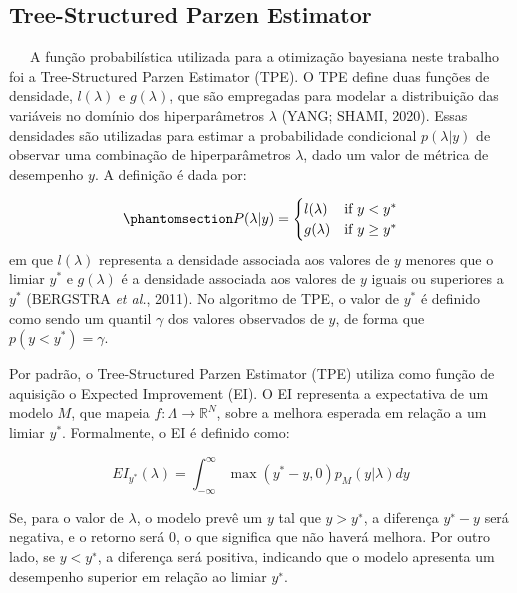 \documentclass[
  12pt,
  a4paper,
]{scrreprt}
\begin{document}
\subsection{Tree-Structured Parzen
Estimator}\label{tree-structured-parzen-estimator}

~~~A função probabilística utilizada para a otimização bayesiana neste
trabalho foi a Tree-Structured Parzen Estimator (TPE). O TPE define duas
funções de densidade, \(l\left(\lambda\right)\) e
\(g\left(\lambda\right)\), que são empregadas para modelar a
distribuição das variáveis no domínio dos hiperparâmetros \(\lambda\)
(YANG; SHAMI, 2020). Essas densidades são utilizadas para estimar a
probabilidade condicional \(p\left(\lambda | y\right)\) de observar uma
combinação de hiperparâmetros \(\lambda\), dado um valor de métrica de
desempenho \(y\). A definição é dada por:

\begin{equation}\phantomsection\label{eq-tpe}{
P(\lambda|y) =
\begin{cases}
    l(\lambda) & \text{if } y < y^* \\
    g(\lambda) & \text{if } y \ge y^*
\end{cases}
}\end{equation} em que \(l\left(\lambda\right)\) representa a densidade
associada aos valores de \(y\) menores que o limiar \(y^*\) e
\(g\left(\lambda\right)\) é a densidade associada aos valores de \(y\)
iguais ou superiores a \(y^*\) (BERGSTRA \emph{et al.}, 2011). No
algoritmo de TPE, o valor de \(y^*\) é definido como sendo um quantil
\(\gamma\) dos valores observados de \(y\), de forma que
\(p\left(y < y^*\right) = \gamma\).

\vspace{12pt}

Por padrão, o Tree-Structured Parzen Estimator (TPE) utiliza como função
de aquisição o Expected Improvement (EI). O EI representa a expectativa
de um modelo \(M\), que mapeia \(f:\Lambda \rightarrow \mathbb{R}^N\),
sobre a melhora esperada em relação a um limiar \(y^*\). Formalmente, o
EI é definido como:

\[
EI_{y^*}\left(\lambda\right) = \int_{-\infty}^{\infty} \max\left(y^* - y, 0\right)p_{M}\left(y|\lambda\right)dy
\]

Se, para o valor de \(\lambda\), o modelo prevê um \(y\) tal que
\(y > y^∗\), a diferença \(y^∗ − y\) será negativa, e o retorno será 0,
o que significa que não haverá melhora. Por outro lado, se \(y < y^∗\),
a diferença será positiva, indicando que o modelo apresenta um
desempenho superior em relação ao limiar \(y^∗\).
\end{document}
